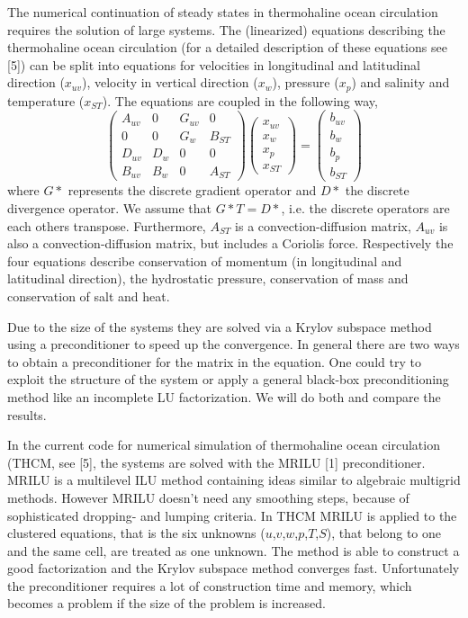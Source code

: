 \documentclass[twosided]{report}
\begin{document}
The numerical continuation of steady states in thermohaline ocean
circulation requires the solution of large systems. The (linearized)
equations describing the thermohaline ocean circulation (for a detailed
description of these equations see [5]) can be split into equations
for velocities in longitudinal and latitudinal direction ($x_{uv}$),
velocity in vertical direction ($x_w$), pressure ($x_p$) and salinity and
temperature ($x_{ST}$). The equations are coupled in the following way,
$$ \left( \begin{array}{cccc}
A_{uv} & 0 & G_{uv} & 0 \\
0 & 0 & G_w & B_{ST} \\
D_{uv} & D_w & 0 & 0 \\
B_{uv} & B_w & 0 & A_{ST}
\end{array}\right)
\left( \begin{array}{c}
	x_{uv} \\ x_{w} \\ x_{p} \\ x_{ST}
	\end{array}\right)
= \left( \begin{array}{c}
	b_{uv} \\ b_{w} \\ b_{p} \\ b_{ST}
	\end{array}\right)
$$
where $G*$ represents the discrete gradient operator and $D*$ the discrete
divergence operator. We assume that $G*T=D*$, i.e. the discrete operators
are each others transpose. Furthermore, $A_{ST}$ is a convection-diffusion
matrix, $A_{uv}$ is also a convection-diffusion matrix, but includes a
Coriolis force. Respectively the four equations describe conservation
of momentum (in longitudinal and latitudinal direction), the
hydrostatic pressure, conservation of mass and conservation of salt and
heat.

Due to the size of the systems they are solved via a Krylov subspace
method using a preconditioner to speed up the convergence. In general
there are two ways to obtain a preconditioner for the matrix in the
equation. One could try to exploit the structure of the system or apply
a general black-box preconditioning method like an incomplete LU
factorization. We will do both and compare the results.

In the current code for numerical simulation of thermohaline ocean
circulation (THCM, see [5], the systems are solved with the MRILU [1]
preconditioner. MRILU is a multilevel ILU method containing ideas
similar to algebraic multigrid methods. However MRILU doesn't need any
smoothing steps, because of sophisticated dropping- and lumping
criteria. In THCM MRILU is applied to the clustered equations, that is
the six unknowns ($u$,$v$,$w$,$p$,$T$,$S$),
that belong to one and the same cell,
are treated as one unknown. The method is able to construct a good
factorization and the Krylov subspace method converges fast.
Unfortunately the preconditioner requires a lot of construction time
and memory, which becomes a problem if the size of the problem is
increased.
\end{document}
